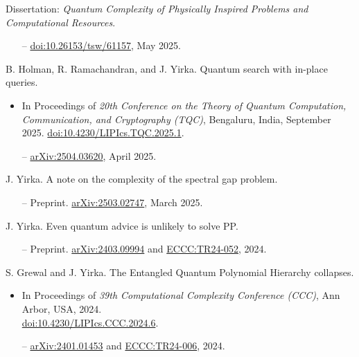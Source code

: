 \documentclass[11pt,letterpaper,serif]{moderncv}
\begin{document}
Dissertation: \textit{Quantum Complexity of Physically Inspired Problems and Computational Resources}. 
\begin{adjustwidth}{.25in}{}
	\begin{itemize}
		\item[--] \href{https://doi.org/10.26153/tsw/61157}{doi:10.26153/tsw/61157}, May 2025.
	\end{itemize}
\end{adjustwidth}
\medskip


B. Holman, R. Ramachandran, and J. Yirka.\quad
Quantum search with in-place queries.
\begin{adjustwidth}{.25in}{}
	\begin{itemize}
		\item In Proceedings of \textit{20th Conference on the Theory of Quantum Computation, Communication, and Cryptography (TQC)}, Bengaluru, India, September 2025.\quad
		\href{https://doi.org/10.4230/LIPIcs.TQC.2025.1}{doi:10.4230/LIPIcs.TQC.2025.1}.
		\item[--] \href{https://arxiv.org/abs/2504.03620}{arXiv:2504.03620},
		April 2025.
	\end{itemize}
\end{adjustwidth}
\medskip

J. Yirka.\quad
A note on the complexity of the spectral gap problem.
\begin{adjustwidth}{.25in}{}
	\begin{itemize}
		\item[--] Preprint. \href{https://arxiv.org/abs/2503.02747}{arXiv:2503.02747},
		March 2025.
	\end{itemize}
\end{adjustwidth}
\medskip

J. Yirka.\quad
Even quantum advice is unlikely to solve \textup{PP}.
\begin{adjustwidth}{.25in}{}
	\begin{itemize}
		\item[--] Preprint. \href{https://arxiv.org/abs/2403.09994}{arXiv:2403.09994} and \href{https://eccc.weizmann.ac.il/report/2024/052/}{ECCC:TR24-052}, 2024.
	\end{itemize}
\end{adjustwidth}
\medskip

S. Grewal and J. Yirka.\quad
The Entangled Quantum Polynomial Hierarchy collapses.
\begin{adjustwidth}{.25in}{}
	\begin{itemize}
		\item In Proceedings of \textit{39th Computational Complexity Conference (CCC)}, Ann Arbor, USA, 2024.\quad
		\\
		\href{https://doi.org/10.4230/LIPIcs.CCC.2024.6}{doi:10.4230/LIPIcs.CCC.2024.6}.
		\item[--] \href{https://arxiv.org/abs/2401.01453}{arXiv:2401.01453} and \href{https://eccc.weizmann.ac.il/report/2024/006/}{ECCC:TR24-006}, 2024.
	\end{itemize}
\end{adjustwidth}
\medskip
\end{document}
